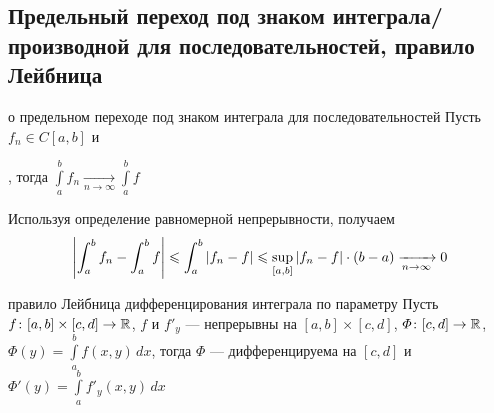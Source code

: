\subsection{Предельный переход под знаком интеграла\slash производной для последовательностей, правило Лейбница}

\begin{teor}[https://www.youtube.com/live/Ebv-BznzM6k?si=RuXzZttXQEEHu5uP&t=9695]{о предельном переходе под знаком интеграла для последовательностей}\label{пер.под инт.}
	Пусть $f_n \in C[a, b]$  и\!, тогда $\int\limits_a^b f_n \xrightarrow[n \to \infty]{} \int\limits_a^b f$
\end{teor} %

\begin{prf} %
	Используя определение равномерной непрерывности, получаем
	\[\left| \int_a^b f_n - \int_a^b f \right| \leqslant \int_a^b |f_n - f| \leqslant \sup_{[a, b]} |f_n - f| \cdot (b - a) \xrightarrow[n \to \infty]{} 0\]
\end{prf} %
\pagebreak
\begin{teor}[https://www.youtube.com/live/Ebv-BznzM6k?si=iFyP1BR_34MXd5Q_&t=9897]{правило Лейбница дифференцирования интеграла по параметру}\label{пр.лейб.}
	Пусть $f \colon [a, b] \times [c, d] \to \mathbb R$, $f$ и $f'_y$ --- непрерывны на $[a, b] \times [c, d]$, $\varPhi \colon [c, d] \to \mathbb R$, $\varPhi(y) = \int\limits_a^bf(x, y) \, dx$, тогда $\varPhi$ --- дифференцируема на $[c, d]$ и $\varPhi '(y) = \int\limits_a^b f'_y(x, y)\,dx$ 
\end{teor} %

